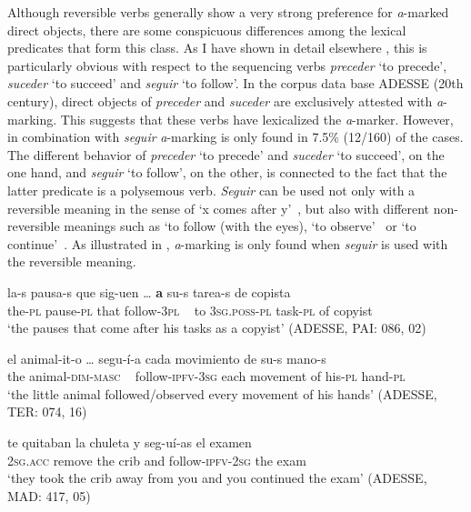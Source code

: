 \documentclass[output=paper]{LSP/langsci}
\begin{document}
Although reversible verbs generally show a very strong preference for \textit{a}-marked direct objects, there are some conspicuous differences among the lexical predicates that form this class. As I have shown in detail elsewhere \citep[162--167]{GarciaGarcia2014Objektmarkierung}, this is particularly obvious with respect to the sequencing verbs \textit{preceder} ‘to precede’, \textit{suceder} ‘to succeed’ and \textit{seguir} ‘to follow’. In the corpus data base ADESSE (20th century),  direct objects of \textit{preceder} and \textit{suceder} are exclusively attested with \textit{a}-marking. This suggests that these verbs have lexicalized the \textit{a}-marker. However, in combination with \textit{seguir} \textit{a}-marking is only found in 7.5\% (12/160) of the cases. The different behavior of \textit{preceder} ‘to precede’ and \textit{suceder} ‘to succeed’, on the one hand, and \textit{seguir} ‘to follow’, on the other, is connected to the fact that the latter predicate is a polysemous verb. \textit{Seguir} can be used not only with a reversible meaning in the sense of ‘x comes after y’~, but also with different non-reversible meanings such as ‘to follow (with the eyes), ‘to observe’~ or ‘to continue’~. As illustrated in , \textit{a}-marking is only found when \textit{seguir} is used with the reversible meaning.

\begin{exe}
\ex \label{08-ga-ex:20} %
\ea \label{08-ga-ex:20a} 
\gll la-s pausa-s que sig-uen {\ob}…{\cb} \textbf{a} su-s tarea-s de copista\\
 the-\textsc{pl} pause-\textsc{pl} that follow-3\textsc{pl} ~ to \textsc{3sg.poss}-\textsc{pl} task-\textsc{pl} of copyist\\
\glt ‘the pauses that come after his tasks as a copyist’ 
 (ADESSE, PAI: 086, 02)
 
\ex \label{08-ga-ex:20b} 
\gll el animal-it-o {\ob}…{\cb} segu-í-a cada movimiento de su-s mano-s\\
 the animal-\textsc{dim-masc} ~ follow-\textsc{ipfv-3sg} each movement of his-\textsc{pl} hand-\textsc{pl}\\
\glt ‘the little animal followed/observed every movement of his hands’ (ADESSE, TER: 074, 16)

\ex \label{08-ga-ex:20c} 
\gll te quitaban la chuleta y seg-uí-as el examen\\
 2\textsc{sg.acc} remove the crib and follow-\textsc{ipfv-2sg} the exam\\
\glt ‘they took the crib away from you and you continued the exam’ (ADESSE, MAD: 417, 05)
\z
\end{exe}
\end{document}
